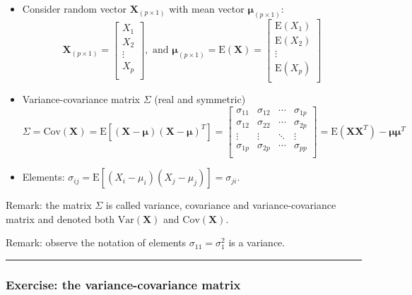 \documentclass[]{article}
\providecommand{\tightlist}{%
  \setlength{\itemsep}{0pt}\setlength{\parskip}{0pt}}
\begin{document}
\begin{itemize}
\tightlist
\item
  Consider random vector \(\mathbf{X}_{(p\times 1)}\) with mean vector
  \(\mathbf{\mu}_{(p\times 1)}\):
  \[\mathbf{X}_{(p\times 1)} =\left[ \begin{array}{c} X_1\\ X_2\\ \vdots\\ X_p\\ \end{array} \right], \text{ and }\mathbf{\mu}_{(p\times 1)} =\text{E}(\mathbf{X})=\left[ \begin{array}{c} \text{E}(X_1)\\ \text{E}(X_2)\\ \vdots\\ \text{E}(X_p)\\ \end{array}\right]\]
\item
  Variance-covariance matrix \(\Sigma\) (real and symmetric)
  \[\Sigma=\text{Cov}(\mathbf{X})=\text{E}[(\mathbf{X}-\mathbf{\mu})(\mathbf{X}-\mathbf{\mu})^T]= \left[ \begin{array}{cccc} \sigma_{11} & \sigma_{12} & \cdots & \sigma_{1p}\\ \sigma_{12} & \sigma_{22} & \cdots & \sigma_{2p}\\ \vdots & \vdots & \ddots & \vdots\\ \sigma_{1p} & \sigma_{2p} & \cdots & \sigma_{pp}\\ \end{array}  \right]= \text{E}(\mathbf{X}\mathbf{X}^T)-\mathbf{\mu}\mathbf{\mu}^T\]
\item
  Elements:
  \(\sigma_{ij}=\text{E}[(X_i-\mu_i)(X_j-\mu_j)]=\sigma_{ji}\).
\end{itemize}

Remark: the matrix \(\Sigma\) is called variance, covariance and
variance-covariance matrix and denoted both \(\text{Var}(\mathbf{X})\)
and \(\text{Cov}(\mathbf{X})\).

Remark: observe the notation of elements \(\sigma_{11}=\sigma_1^2\) is a
variance.

\begin{center}\rule{0.5\linewidth}{\linethickness}\end{center}

\hypertarget{exercise-the-variance-covariance-matrix}{%
\subsubsection{Exercise: the variance-covariance
matrix}\label{exercise-the-variance-covariance-matrix}}
\end{document}
